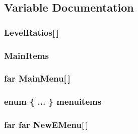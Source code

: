 \subsection{Variable Documentation}
\hypertarget{WL__MENU_8H_a2445c6731e7a1b5e7b8f3da17525e322}{
\subsubsection[{LevelRatios}]{ {\bf LevelRatios}\mbox{[}$\,$\mbox{]}}}
\label{WL__MENU_8H_a2445c6731e7a1b5e7b8f3da17525e322}
\hypertarget{WL__MENU_8H_a93c27abff0c41dacc4c91cba6616ebc8}{
\subsubsection[{MainItems}]{ {\bf MainItems}}}
\label{WL__MENU_8H_a93c27abff0c41dacc4c91cba6616ebc8}
\hypertarget{WL__MENU_8H_a6d3982b9d13e9f258a6229f7c6259fd2}{
\subsubsection[{MainMenu}]{ far {\bf MainMenu}\mbox{[}$\,$\mbox{]}}}
\label{WL__MENU_8H_a6d3982b9d13e9f258a6229f7c6259fd2}
\hypertarget{WL__MENU_8H_ae41a615bd5a5e741ff7c27e54c48bbcb}{
\subsubsection[{menuitems}]{\setlength{\rightskip}{0pt plus 5cm}enum \{ ... \}   {\bf menuitems}}}
\label{WL__MENU_8H_ae41a615bd5a5e741ff7c27e54c48bbcb}
\hypertarget{WL__MENU_8H_a533b654d50a711383a0d2135cf4bd86a}{
\subsubsection[{NewEMenu}]{ far far {\bf NewEMenu}\mbox{[}$\,$\mbox{]}}}

